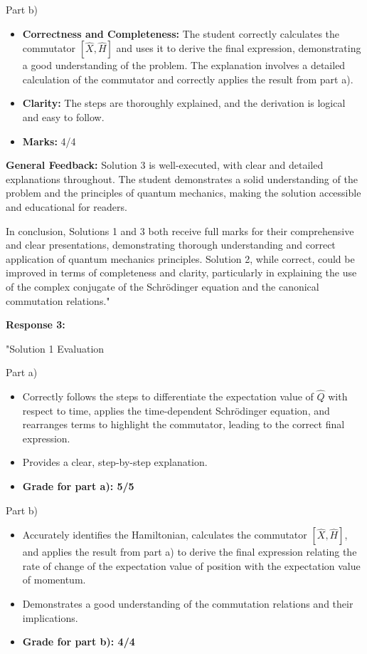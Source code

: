 \documentclass[a4paper,11pt]{article}
\begin{document}
Part b)

\begin{itemize}
    \item \textbf{Correctness and Completeness:} The student correctly calculates the commutator \( \left[ \hat{X}, \hat{H}\right] \) and uses it to derive the final expression, demonstrating a good understanding of the problem. The explanation involves a detailed calculation of the commutator and correctly applies the result from part a).
    \item \textbf{Clarity:} The steps are thoroughly explained, and the derivation is logical and easy to follow.
    \item \textbf{Marks:} 4/4
\end{itemize}

\textbf{General Feedback:} Solution 3 is well-executed, with clear and detailed explanations throughout. The student demonstrates a solid understanding of the problem and the principles of quantum mechanics, making the solution accessible and educational for readers.

In conclusion, Solutions 1 and 3 both receive full marks for their comprehensive and clear presentations, demonstrating thorough understanding and correct application of quantum mechanics principles. Solution 2, while correct, could be improved in terms of completeness and clarity, particularly in explaining the use of the complex conjugate of the Schrödinger equation and the canonical commutation relations."

\textbf{Response 3:}

"Solution 1 Evaluation

Part a)

\begin{itemize}
    \item Correctly follows the steps to differentiate the expectation value of \( \hat{Q} \) with respect to time, applies the time-dependent Schrödinger equation, and rearranges terms to highlight the commutator, leading to the correct final expression.
    \item Provides a clear, step-by-step explanation.
    \item \textbf{Grade for part a): 5/5}
\end{itemize}

Part b)

\begin{itemize}
    \item Accurately identifies the Hamiltonian, calculates the commutator \(\left[ \hat{X}, \hat{H}\right]\), and applies the result from part a) to derive the final expression relating the rate of change of the expectation value of position with the expectation value of momentum.
    \item Demonstrates a good understanding of the commutation relations and their implications.
    \item \textbf{Grade for part b): 4/4}
\end{itemize}
\end{document}
